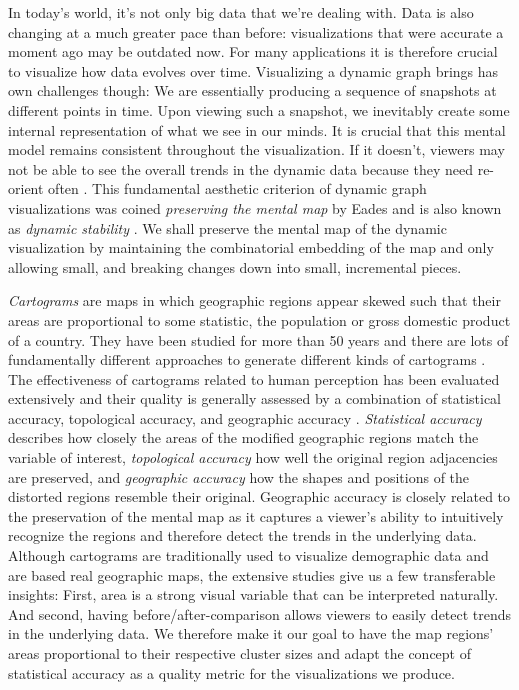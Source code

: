 In today's world, it's not only big data that we're dealing with. Data is also changing at a much greater pace than before: visualizations that were accurate a moment ago may be outdated now. For many applications it is therefore crucial to visualize how data evolves over time. Visualizing a dynamic graph brings has own challenges though: We are essentially producing a sequence of snapshots at different points in time. Upon viewing such a snapshot, we inevitably create some internal representation of what we see in our minds. It is crucial that this mental model remains consistent throughout the visualization. If it doesn't, viewers may not be able to see the overall trends in the dynamic data because they need re-orient often \cite{bohringer1990using} \cite{lee2006mental} \cite{purchase2006important}. This fundamental aesthetic criterion of dynamic graph visualizations was coined \emph{preserving the mental map} by Eades \etal{} \cite{eades1991preserving} \cite{misue1995layout} and is also known as \emph{dynamic stability} \cite{diehl2002graphs}. We shall preserve the mental map of the dynamic visualization by maintaining the combinatorial embedding of the map and only allowing small, and breaking changes down into small, incremental pieces.

\emph{Cartograms} are maps in which geographic regions appear skewed such that their areas are proportional to some statistic, \eg{} the population or gross domestic product of a country. They have been studied for more than 50 years \cite{tobler2004thirty} and there are lots of fundamentally different approaches to generate different kinds of cartograms \cite{nusrat2016state}. The effectiveness of cartograms related to human perception has been evaluated extensively \cite{nusrat2018evaluating} and their quality is generally assessed by a combination of statistical accuracy, topological accuracy, and geographic accuracy \cite{nusrat2016state} \cite{alam2015quantitative} \cite{nusrat2018evaluating}. \emph{Statistical accuracy} describes how closely the areas of the modified geographic regions match the variable of interest, \emph{topological accuracy} how well the original region adjacencies are preserved, and \emph{geographic accuracy} how the shapes and positions of the distorted regions resemble their original. Geographic accuracy is closely related to the preservation of the mental map as it captures a viewer's ability to intuitively recognize the regions and therefore detect the trends in the underlying data. Although cartograms are traditionally used to visualize demographic data and are based real geographic maps, the extensive studies give us a few transferable insights: First, area is a strong visual variable that can be interpreted naturally. And second, having before/after-comparison allows viewers to easily detect trends in the underlying data. We therefore make it our goal to have the map regions' areas proportional to their respective cluster sizes and adapt the concept of statistical accuracy as a quality metric for the visualizations we produce.


